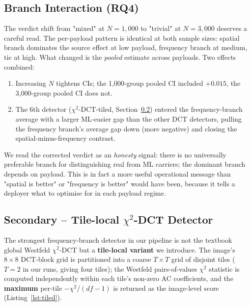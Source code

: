 \documentclass[10pt,twocolumn,a4paper]{article}
\begin{document}
\subsection{Branch Interaction (RQ4)}
\label{sec:rq4discussion}

The verdict shift from "mixed" at $N\!=\!1{,}000$ to "trivial" at $N\!=\!3{,}000$ deserves a careful read. The per-payload pattern is identical at both sample sizes: spatial branch dominates the source effect at low payload, frequency branch at medium, tie at high. What changed is the \emph{pooled} estimate across payloads. Two effects combined:
\begin{enumerate}
\item Increasing $N$ tightens CIs; the 1{,}000-group pooled CI included $+0.015$, the 3{,}000-group pooled CI does not.
\item The 6th detector ($\chi^2$-DCT-tiled, Section~\ref{sec:tiled}) entered the frequency-branch average with a larger ML-easier gap than the other DCT detectors, pulling the frequency branch's average gap down (more negative) and closing the spatial-minus-frequency contrast.
\end{enumerate}
We read the corrected verdict as an \emph{honesty} signal: there is no universally preferable branch for distinguishing real from ML carriers; the dominant branch depends on payload. This is in fact a more useful operational message than "spatial is better" or "frequency is better" would have been, because it tells a deployer what to optimise for in each payload regime.

\subsection{Secondary -- Tile-local $\chi^2$-DCT Detector}
\label{sec:tiled}

The strongest frequency-branch detector in our pipeline is not the textbook global Westfeld $\chi^2$-DCT but a \textbf{tile-local variant} we introduce. The image's $8\!\times\!8$ DCT-block grid is partitioned into a coarse $T\!\times\!T$ grid of disjoint tiles ($T\!=\!2$ in our runs, giving four tiles); the Westfeld pairs-of-values $\chi^2$ statistic is computed independently within each tile's non-zero AC coefficients, and the \textbf{maximum} per-tile $-\chi^2/(df\!-\!1)$ is returned as the image-level score (Listing~\ref{lst:tiled}).
\end{document}
